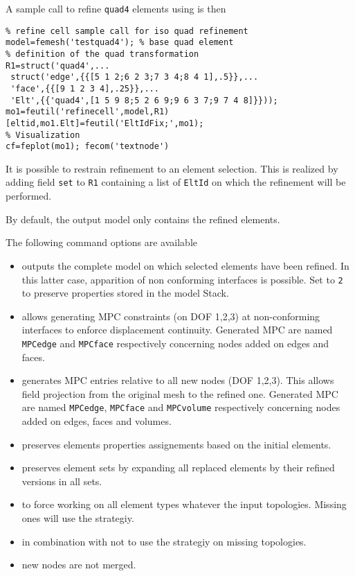\begin{itemize}
A sample call to refine {\tt quad4} elements using  is then

\begin{verbatim}
% refine cell sample call for iso quad refinement
model=femesh('testquad4'); % base quad element
% definition of the quad transformation
R1=struct('quad4',...
 struct('edge',{{[5 1 2;6 2 3;7 3 4;8 4 1],.5}},...
 'face',{{[9 1 2 3 4],.25}},...
 'Elt',{{'quad4',[1 5 9 8;5 2 6 9;9 6 3 7;9 7 4 8]}}));
mo1=feutil('refinecell',model,R1)
[eltid,mo1.Elt]=feutil('EltIdFix;',mo1);
% Visualization
cf=feplot(mo1); fecom('textnode')
\end{verbatim}%

It is possible to restrain refinement to an element selection. This is realized by adding field {\tt set} to {\tt R1} containing a list of {\tt EltId} on which the refinement will be performed.

By default, the output model only contains the refined elements.

The following command options are available
\begin{itemize}
\item {} outputs the complete model on which selected elements have been refined. In this latter case, apparition of non conforming interfaces is possible. Set  to {\tt 2} to preserve properties stored in the model Stack.
\item {} allows generating MPC constraints (on DOF 1,2,3) at non-conforming interfaces to enforce displacement continuity. Generated MPC are named {\tt MPCedge} and {\tt MPCface} respectively concerning nodes added on edges and faces.
\item {} generates MPC entries relative to all new nodes (DOF 1,2,3). This allows field projection from the original mesh to the refined one. Generated MPC are named {\tt MPCedge}, {\tt MPCface} and {\tt MPCvolume} respectively concerning nodes added on edges, faces and volumes.
\item {} preserves elements properties assignements based on the initial elements.
\item {} preserves element sets by expanding all replaced elements by their refined versions in all sets.
\item {} to force working on all element types whatever the input topologies. Missing ones will use the  strategiy.
\item {} in combination with  not to use the  strategiy on missing topologies.
\item {} new nodes are not merged.
\end{itemize}


\end{itemize}
